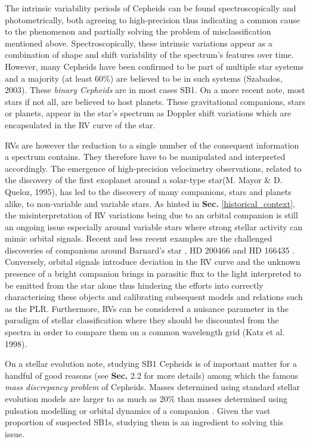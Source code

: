             \noindent The intrinsic variability periods of Cepheids can be found spectroscopically and photometrically, both agreeing to high-precision thus indicating a common cause to the phenomenon and partially solving the problem of misclassification mentioned above. Spectroscopically, these intrinsic variations appear as a combination of shape and shift variability of the spectrum's features over time. However, many Cepheids have been confirmed to be part of multiple star systems and a majority (at least 60\%) are believed to be in such systems (Szabados, 2003). These \textit{binary Cepheids} are in most cases \ac{SB1}. On a more recent note, most stars if not all, are believed to host planets. These gravitational companions, stars or planets, appear in the star's spectrum as Doppler shift variations which are encapsulated in the \ac{RV} curve of the star.

            \noindent \ac{RV}s are however the reduction to a single number of the consequent information a spectrum contains. They therefore have to be manipulated and interpreted accordingly. The emergence of high-precision velocimetry observations, related to the discovery of the first exoplanet around a solar-type star(M. Mayor \& D. Queloz, 1995), has led to the discovery of many companions, stars and planets alike, to non-variable and variable stars. As hinted in \textbf{Sec.} \ref{historical_context}, the misinterpretation of \ac{RV} variations being due to an orbital companion is still an ongoing issue especially around variable stars where strong stellar activity can mimic orbital signals. Recent and less recent examples are the challenged discoveries of companions around Barnard's star \parencite{Lubin2021StellarPositive}, HD 200466 \parencite{Carolo2014A200466} and HD 166435 \parencite{Queloz2001No166435,Queloz2001No166435b}. Conversely, orbital signals introduce deviation in the \ac{RV} curve and the unknown presence of a bright companion brings in parasitic flux to the light interpreted to be emitted from the star alone thus hindering the efforts into correctly characterising these objects and calibrating subsequent models and relations such as the \ac{PLR}\parencite{Anderson2009ClassicalRotation}. Furthermore, \ac{RV}s can be considered a nuisance parameter in the paradigm of stellar classification where they should be discounted from the spectra in order to compare them on a common wavelength grid (Katz et al. 1998).

            \noindent On a stellar evolution note, studying \ac{SB1} Cepheids is of important matter for a handful of good reasons (see \cite{Anderson2009ClassicalRotation} \textbf{Sec.} 2.2 for more details) among which the famous \textit{mass discrepancy problem} of Cepheids. Masses determined using standard stellar evolution models are larger to as much as 20\% than masses determined using pulsation modelling or orbital dynamics of a companion \parencite{Guzik2021ChallengesModeling}. Given the vast proportion of suspected \ac{SB1}s, studying them is an ingredient to solving this issue.
